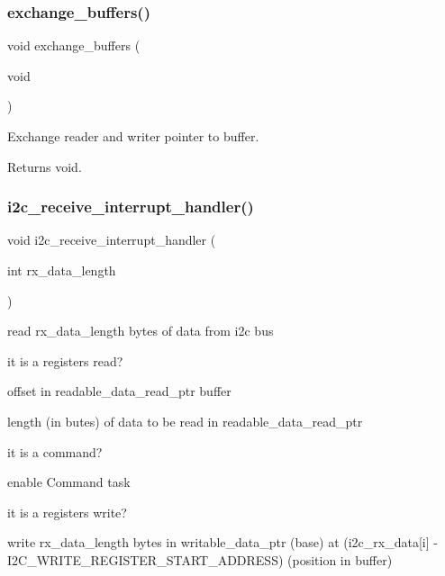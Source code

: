\subsubsection{\texorpdfstring{exchange\+\_\+buffers()}{exchange\_buffers()}}
{\footnotesize\ttfamily void exchange\+\_\+buffers (\begin{DoxyParamCaption}\item[{void}]{ }\end{DoxyParamCaption})}



Exchange reader and writer pointer to buffer. 

\begin{DoxyReturn}{Returns}
void. 
\end{DoxyReturn}
\mbox{\label{i2c-rain_8ino_a6e27532df66f6bf186654355def5c9af}} 
\subsubsection{\texorpdfstring{i2c\+\_\+receive\+\_\+interrupt\+\_\+handler()}{i2c\_receive\_interrupt\_handler()}}
{\footnotesize\ttfamily void i2c\+\_\+receive\+\_\+interrupt\+\_\+handler (\begin{DoxyParamCaption}\item[{int}]{rx\+\_\+data\+\_\+length }\end{DoxyParamCaption})}

read rx\+\_\+data\+\_\+length bytes of data from i2c bus

it is a registers read?

offset in readable\+\_\+data\+\_\+read\+\_\+ptr buffer

length (in butes) of data to be read in readable\+\_\+data\+\_\+read\+\_\+ptr

it is a command?

enable Command task

it is a registers write?

write rx\+\_\+data\+\_\+length bytes in writable\+\_\+data\+\_\+ptr (base) at (i2c\+\_\+rx\+\_\+data\mbox{[}i\mbox{]} -\/ I2\+C\+\_\+\+W\+R\+I\+T\+E\+\_\+\+R\+E\+G\+I\+S\+T\+E\+R\+\_\+\+S\+T\+A\+R\+T\+\_\+\+A\+D\+D\+R\+E\+SS) (position in buffer) \mbox{\label{i2c-rain_8ino_ac816bd8aafe77e7a571574c8a26eead5}} 
